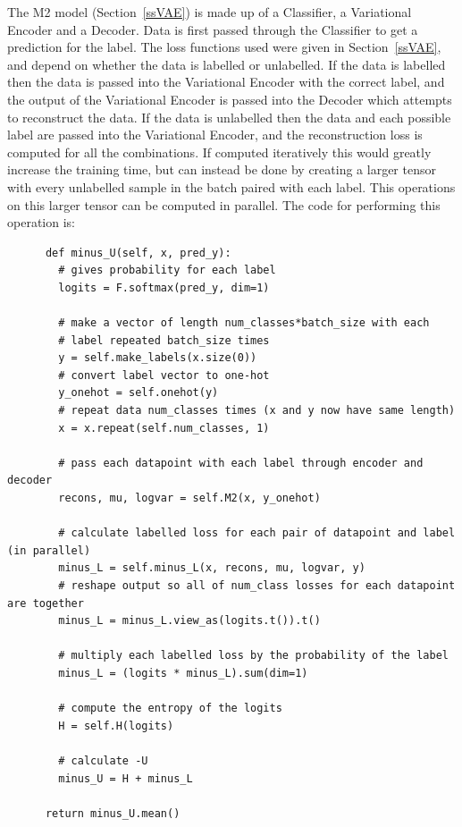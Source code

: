 The M2 model (Section~\ref{ssVAE}) is made up of a Classifier, a Variational Encoder and a Decoder.
Data is first passed through the Classifier to get a prediction for the label. The loss functions used were given in Section~\ref{ssVAE}, 
and depend on whether the data is labelled or unlabelled. If the data is labelled then the data is passed into the Variational Encoder 
with the correct label, and the output of the Variational Encoder is passed into the Decoder which attempts to reconstruct the data.
If the data is unlabelled then the data and each possible label are passed into the Variational Encoder, and the reconstruction loss 
is computed for all the combinations. If computed iteratively this would greatly increase the training time, but can instead be done 
by creating a larger tensor with every unlabelled sample in the batch paired with each label. This operations on this larger tensor 
can be computed in parallel. The code for performing this 
operation is:

{\renewcommand{\baselinestretch}{0.8}\small
    \begin{verbatim}
      def minus_U(self, x, pred_y):
        # gives probability for each label
        logits = F.softmax(pred_y, dim=1)

        # make a vector of length num_classes*batch_size with each 
        # label repeated batch_size times
        y = self.make_labels(x.size(0))
        # convert label vector to one-hot
        y_onehot = self.onehot(y)
        # repeat data num_classes times (x and y now have same length)
        x = x.repeat(self.num_classes, 1)

        # pass each datapoint with each label through encoder and decoder
        recons, mu, logvar = self.M2(x, y_onehot)
        
        # calculate labelled loss for each pair of datapoint and label (in parallel)
        minus_L = self.minus_L(x, recons, mu, logvar, y)
        # reshape output so all of num_class losses for each datapoint are together
        minus_L = minus_L.view_as(logits.t()).t()
        
        # multiply each labelled loss by the probability of the label
        minus_L = (logits * minus_L).sum(dim=1)

        # compute the entropy of the logits
        H = self.H(logits)

        # calculate -U
        minus_U = H + minus_L

      return minus_U.mean()
    \end{verbatim}
}

